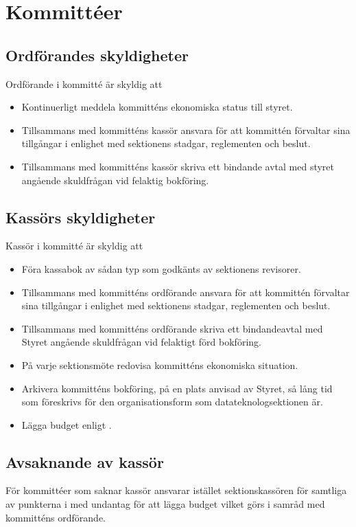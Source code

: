 \documentclass[a4paper]{dtek}
\begin{document}
\section{Kommittéer}
\label{sec:kommitteer}

\subsection{Ordförandes skyldigheter}
Ordförande i kommitté är skyldig att
\begin{itemize}
\item Kontinuerligt meddela kommitténs ekonomiska status till styret.
\item Tillsammans med kommitténs kassör ansvara för att kommittén förvaltar sina tillgångar i enlighet med sektionens stadgar, reglementen och beslut.
\item Tillsammans med kommitténs kassör skriva ett bindande avtal med styret angående skuldfrågan vid felaktig bokföring.
\end{itemize}
\subsection{Kassörs skyldigheter}
\label{sec:kommittee_kassor}
Kassör i kommitté är skyldig att
\begin{itemize}
\item Föra kassabok av sådan typ som godkänts av sektionens revisorer.
\item Tillsammans med kommitténs ordförande ansvara för att kommittén förvaltar sina tillgångar i enlighet med sektionens stadgar, reglementen och beslut.
\item Tillsammans med kommitténs ordförande skriva ett bindandeavtal med Styret angående skuldfrågan vid felaktigt förd bokföring.
\item På varje sektionsmöte redovisa kommitténs ekonomiska situation.
\item Arkivera kommitténs bokföring, på en plats anvisad av Styret, så lång tid som föreskrivs för den organisationsform som datateknologsektionen är.
\item Lägga budget enligt .
\end{itemize}
\subsection{Avsaknande av kassör}
För kommittéer som saknar kassör ansvarar istället sektionskassören för samtliga av punkterna i  med undantag för att lägga budget vilket görs i samråd med kommitténs ordförande.
\end{document}
